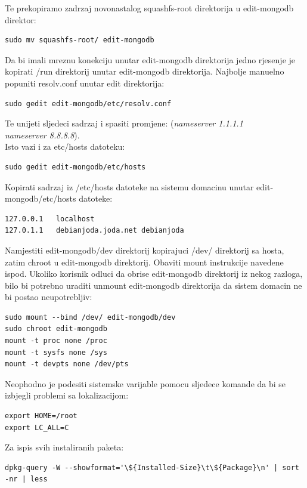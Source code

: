 \documentclass[12pt,vi]{mitthesis}
\begin{document}
Te prekopiramo zadrzaj novonastalog squashfs-root direktorija u edit-mongodb direktor:
\begin{lstlisting}[style=BashInputStyle]
sudo mv squashfs-root/ edit-mongodb
\end{lstlisting}

\noindent
Da bi imali mreznu konekciju unutar edit-mongodb direktorija jedno rjesenje je kopirati /run direktorij unutar edit-mongodb direktorija.
Najbolje manuelno popuniti resolv.conf unutar edit direktorija:
\begin{lstlisting}[style=BashInputStyle]
sudo gedit edit-mongodb/etc/resolv.conf
\end{lstlisting}
Te unijeti sljedeci sadrzaj i spasiti promjene:
(\textit{nameserver 1.1.1.1 \\
nameserver 8.8.8.8}).\\
\noindent
Isto vazi i za etc/hosts datoteku:
\begin{lstlisting}[style=BashInputStyle]
sudo gedit edit-mongodb/etc/hosts
\end{lstlisting}
Kopirati sadrzaj iz /etc/hosts datoteke na sistemu domacinu unutar edit-mongodb/etc/hosts datoteke:
\begin{lstlisting}
127.0.0.1	localhost
127.0.1.1	debianjoda.joda.net	debianjoda
\end{lstlisting}
\noindent
Namjestiti edit-mongodb/dev direktorij kopirajuci /dev/ direktorij sa hosta, zatim chroot u edit-mongodb direktorij.
Obaviti mount instrukcije navedene ispod. Ukoliko korisnik odluci da obrise edit-mongodb direktorij iz nekog razloga,
bilo bi potrebno uraditi unmount edit-mongodb direktorija da sistem domacin ne bi postao neupotrebljiv:
\begin{lstlisting}[style=BashInputStyle]
sudo mount --bind /dev/ edit-mongodb/dev
sudo chroot edit-mongodb
mount -t proc none /proc
mount -t sysfs none /sys
mount -t devpts none /dev/pts
\end{lstlisting}

\noindent
Neophodno je podesiti sistemske varijable pomocu sljedece komande da bi se izbjegli problemi sa lokalizacijom:
\begin{lstlisting}[style=BashInputStyle]
export HOME=/root
export LC_ALL=C
\end{lstlisting}

\noindent
Za ispis svih instaliranih paketa:
\begin{lstlisting}[style=BashInputStyle]
dpkg-query -W --showformat='\${Installed-Size}\t\${Package}\n' | sort -nr | less
\end{lstlisting}
\end{document}
